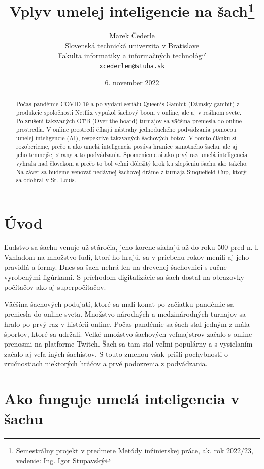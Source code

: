\documentclass[10pt,oneside,slovak,a4paper]{article}
\title{Vplyv umelej inteligencie na šach\thanks{Semestrálny projekt v predmete Metódy inžinierskej práce, ak. rok 2022/23, vedenie: Ing. Igor Stupavský }}
\author{Marek Čederle\\[2pt]
	{\small Slovenská technická univerzita v Bratislave}\\
	{\small Fakulta informatiky a informačných technológií}\\
	{\small \texttt{xcederlem@stuba.sk}}
	}
\date{\small 6. november 2022}
\begin{document}
\maketitle

\vspace*{\fill}

\begin{abstract}
 Počas pandémie COVID-19 a po vydaní seriálu Queen‘s Gambit (Dámsky gambit) z produkcie spoločnosti Netflix vypukol šachový boom v online, ale aj v reálnom svete. Po zrušení takzvaných OTB (Over the board) turnajov sa väčšina preniesla do online prostredia. V online prostredí číhajú nástrahy jednoduchého podvádzania pomocou umelej inteligencie (AI), respektíve takzvaných šachových botov. V tomto článku si rozoberieme, prečo a ako umelá inteligencia posúva hranice samotného šachu, ale aj jeho temnejšej strany a to podvádzania. Spomenieme si ako prvý raz umelá inteligencia vyhrala nad človekom a prečo to bol veľmi dôležitý krok ku zlepšeniu šachu ako takého. Na záver sa budeme venovať nedávnej šachovej dráme z turnaja Sinquefield Cup, ktorý sa odohral v St. Louis.
\end{abstract}

\vspace*{\fill}
\pagebreak


\section{Úvod}

Ľudstvo sa šachu venuje už stáročia, jeho korene siahajú až do roku 500 pred n. l. Vzhľadom na množstvo ľudí, ktorí ho hrajú, sa v priebehu rokov menili aj jeho pravidlá a formy. Dnes sa šach nehrá len na drevenej šachovnici s ručne vyrobenými figúrkami. S príchodom digitalizácie sa šach dostal na  obrazovky počítačov ako aj superpočítačov.

Väčšina šachových podujatí, ktoré sa mali konať po začiatku pandémie sa preniesla do online sveta. Množstvo národných a medzinárodných turnajov sa hralo po prvý raz v histórii online. Počas pandémie sa šach stal jedným z mála športov, ktoré sa udržali. Veľké množstvo šachových veľmajstrov začalo s online prenosmi na platforme Twitch. Šach sa tam stal veľmi populárny a s vysielaním začalo aj veľa iných šachistov. S touto zmenou však  prišli pochybnosti o zručnostiach niektorých hráčov a prvé podozrenia z podvádzania.



\section{Ako funguje umelá inteligencia v šachu}
\end{document}
